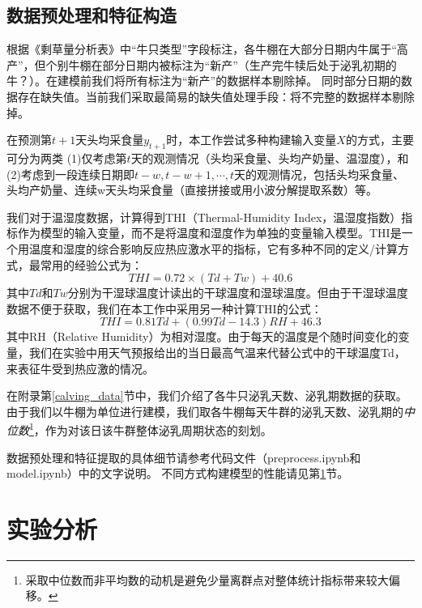 \subsection{数据预处理和特征构造}

根据《剩草量分析表》中“牛只类型”字段标注，各牛棚在大部分日期内牛属于“高产”，但个别牛棚在部分日期内被标注为“新产”（生产完牛犊后处于泌乳初期的牛？）。在建模前我们将所有标注为“新产”的数据样本剔除掉。
同时部分日期的数据存在缺失值。当前我们采取最简易的缺失值处理手段：将不完整的数据样本剔除掉。


在预测第$t+1$天头均采食量$y_{t+1}$时，本工作尝试多种构建输入变量$X$的方式，主要可分为两类
(1)仅考虑第$t$天的观测情况（头均采食量、头均产奶量、温湿度），和(2)考虑到一段连续日期即$t-w, t-w+1, \cdots, t$天的观测情况，包括头均采食量、头均产奶量、连续w天头均采食量（直接拼接或用小波分解提取系数）等。

我们对于温湿度数据，计算得到THI（Thermal-Humidity Index，温湿度指数）指标作为模型的输入变量，而不是将温度和湿度作为单独的变量输入模型。THI是一个用温度和湿度的综合影响反应热应激水平的指标，它有多种不同的定义/计算方式，最常用的经验公式为：
\begin{equation}
	THI=0.72 \times (Td + Tw) + 40.6
\end{equation}
其中$Td$和$Tw$分别为干湿球温度计读出的干球温度和湿球温度。但由于干湿球温度数据不便于获取，我们在本工作中采用另一种计算THI的公式\cite{thi_cow_wang}：
\begin{equation}
	THI=0.81Td + (0.99Td - 14.3)RH + 46.3
\end{equation}
其中RH（Relative Humidity）为相对湿度。由于每天的温度是个随时间变化的变量，我们在实验中用天气预报给出的当日最高气温来代替公式中的干球温度Td，来表征牛受到热应激的情况。

在附录第\ref{calving_data}节中，我们介绍了各牛只泌乳天数、泌乳期数据的获取。由于我们以牛棚为单位进行建模，我们取各牛棚每天牛群的泌乳天数、泌乳期的\emph{中位数}\footnote{采取中位数而非平均数的动机是避免少量离群点对整体统计指标带来较大偏移。}，作为对该日该牛群整体泌乳周期状态的刻划。


数据预处理和特征提取的具体细节请参考代码文件（preprocess.ipynb和model.ipynb）中的文字说明。
不同方式构建模型的性能请见第\ref{evaluation}节。







\section{实验分析}
\label{evaluation}

